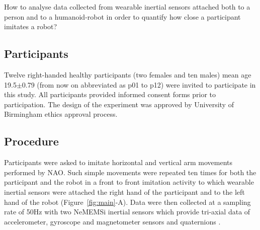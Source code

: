 \documentclass{sig-alternate-05-2015}
\begin{document}
How to analyse  data collected from wearable inertial sensors attached both 
to a person and to a humanoid-robot in order to quantify how close a participant 
imitates a robot?










\subsection{Participants}
Twelve right-handed healthy participants (two females and ten males)
mean age 19.5$\pm$0.79 (from now on abbreviated as p01 to p12) were invited to 
participate in this study. 
All participants provided informed consent forms prior to participation.
The design of the experiment was approved by University of Birmingham ethics approval
process. 


% 
\subsection{Procedure}
Participants were asked to imitate horizontal and vertical arm movements
performed by NAO.
Such simple movements were repeated ten times for both the participant and the robot
 in a front to front imitation activity
 to which
 wearable inertial sensors were attached the right hand of the participant and to the left hand of the robot
(Figure~\ref{fig:main}-A).
Data were then collected at a sampling rate of 50Hz with two NeMEMSi inertial sensors
which provide tri-axial data of accelerometer, gyroscope and magnetometer sensors and
quaternions \cite{Comotti2014}. 
\end{document}
